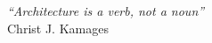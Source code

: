 \cleardoublepage
\thispagestyle{plain}

\vspace*{8cm}

\begin{flushright}
   \textsl{``Architecture is a verb, not a noun''} \\
\vspace*{1.5cm}
           Christ J. Kamages
\end{flushright}

